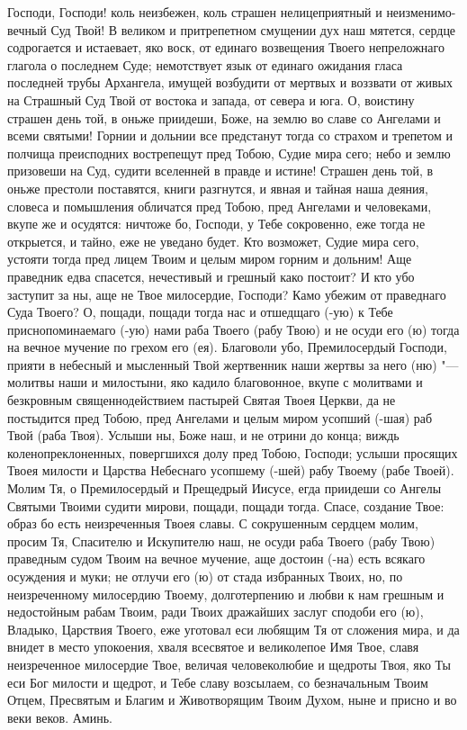 \begin{mymulticols}


Господи, Господи! коль неизбежен, коль страшен нелицеприятный и неизменимо-вечный Суд Твой! В великом и притрепетном смущении дух наш мятется, сердце содрогается и истаевает, яко воск, от единаго возвещения Твоего непреложнаго глагола о последнем Суде; немотствует язык от единаго ожидания гласа последней трубы Архангела, имущей возбудити от мертвых и воззвати от живых на Страшный Суд Твой от востока и запада, от севера и юга. О, воистину страшен день той, в оньже приидеши, Боже, на землю во славе со Ангелами и всеми святыми! Горнии и дольнии все предстанут тогда со страхом и трепетом и полчища преисподних вострепещут пред Тобою, Судие мира сего; небо и землю призовеши на Суд, судити вселенней в правде и истине! Страшен день той, в оньже престоли поставятся, книги разгнутся, и явная и тайная наша деяния, словеса и помышления обличатся пред Тобою, пред Ангелами и человеками, вкупе же и осудятся: ничтоже бо, Господи, у Тебе сокровенно, еже тогда не открыется, и тайно, еже не уведано будет. Кто возможет, Судие мира сего, устояти тогда пред лицем Твоим и целым миром горним и дольним! Аще праведник едва спасется, нечестивый и грешный како постоит? И кто убо заступит за ны, аще не Твое милосердие, Господи? Камо убежим от праведнаго Суда Твоего? О, пощади, пощади тогда нас и отшедщаго (-ую) к Тебе приснопоминаемаго (-ую) нами раба Твоего (рабу Твою)  и не осуди его (ю) тогда на вечное мучение по грехом его (ея). Благоволи убо, Премилосердый Господи, прияти в небесный и мысленный Твой жертвенник наши жертвы за него (ню) "--- молитвы наши и милостыни, яко кадило благовонное, вкупе с молитвами и безкровным священнодействием пастырей Святая Твоея Церкви, да не постыдится пред Тобою, пред Ангелами и целым миром усопший (-шая) раб Твой (раба Твоя). Услыши ны, Боже наш, и не отрини до конца; виждь коленопреклоненных, повергшихся долу пред Тобою, Господи; услыши просящих Твоея милости и Царства Небеснаго усопшему (-шей) рабу Твоему (рабе Твоей). Молим Тя, о Премилосердый и Прещедрый Иисусе, егда приидеши со Ангелы Святыми Твоими судити мирови, пощади, пощади тогда. Спасе, создание Твое: образ бо есть неизреченныя Твоея славы. С сокрушенным сердцем молим, просим Тя, Спасителю и Искупителю наш, не осуди раба Твоего (рабу Твою)  праведным судом Твоим на вечное мучение, аще достоин (-на) есть всякаго осуждения и муки; не отлучи его (ю) от стада избранных Твоих, но, по неизреченному милосердию Твоему, долготерпению и любви к нам грешным и недостойным рабам Твоим, ради Твоих дражайших заслуг сподоби его (ю), Владыко, Царствия Твоего, еже уготовал еси любящим Тя от сложения мира, и да внидет в место упокоения, хваля всесвятое и великолепое Имя Твое, славя неизреченное милосердие Твое, величая человеколюбие и щедроты Твоя, яко Ты еси Бог милости и щедрот, и Тебе славу возсылаем, со безначальным Твоим Отцем, Пресвятым и Благим и Животворящим Твоим Духом, ныне и присно и во веки веков. Аминь. 

\end{mymulticols}

